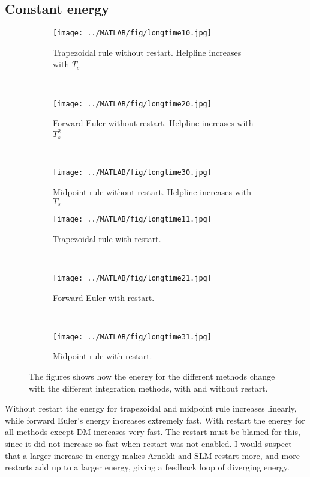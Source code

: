 \subsection{Constant energy}
\begin{figure}[H]
        \centering
        \begin{subfigure}[b]{0.3\textwidth}
                \texttt{[image: ../MATLAB/fig/longtime10.jpg]}
                \caption{ Trapezoidal rule without restart. Helpline increases with $T_s$ }
                \label{fig:longtime10}
        \end{subfigure}
        ~
        \begin{subfigure}[b]{0.3\textwidth}
                \texttt{[image: ../MATLAB/fig/longtime20.jpg]}
                \caption{ Forward Euler without restart. Helpline increases with $T_s^2$ }
                \label{fig:longtime20}
        \end{subfigure}
        ~
        \begin{subfigure}[b]{0.3\textwidth}
                \texttt{[image: ../MATLAB/fig/longtime30.jpg]}
                \caption{ Midpoint rule without restart. Helpline increases with $T_s$ }
                \label{fig:longtime30}
        \end{subfigure}
        
        \begin{subfigure}[b]{0.3\textwidth}
                \texttt{[image: ../MATLAB/fig/longtime11.jpg]}
                \caption{ Trapezoidal rule with restart. }
                \label{fig:longtime11}
        \end{subfigure}
        ~
        \begin{subfigure}[b]{0.3\textwidth}
                \texttt{[image: ../MATLAB/fig/longtime21.jpg]}
                \caption{ Forward Euler with restart. }
                \label{fig:longtime21}
        \end{subfigure}
        ~
        \begin{subfigure}[b]{0.3\textwidth}
                \texttt{[image: ../MATLAB/fig/longtime31.jpg]}
                \caption{ Midpoint rule with restart. }
                \label{fig:longtime31}
        \end{subfigure}
        \caption{ The figures shows how the energy for the different methods change with the different integration methods, with and without restart. }
        \label{fig:longtime}
\end{figure}
Without restart the energy for trapezoidal and midpoint rule increases linearly, while forward Euler's energy increases extremely fast.
With restart the energy for all methods except DM increases very fast. The restart must be blamed for this, since it did not increase so fast when restart was not enabled. I would suspect that a larger increase in energy makes Arnoldi and SLM restart more, and more restarts add up to a larger energy, giving a feedback loop of diverging energy.
